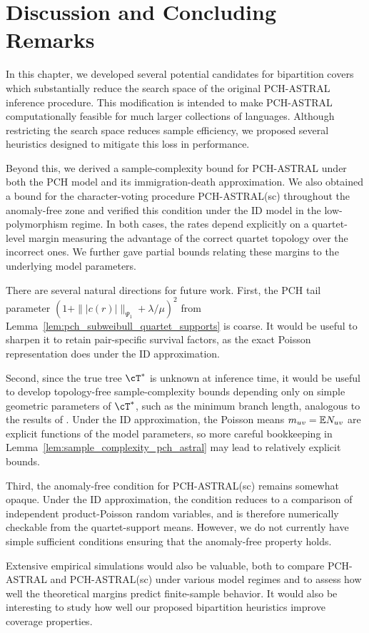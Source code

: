 \section{Discussion and Concluding Remarks}

In this chapter, we developed several potential candidates for bipartition covers which
substantially reduce the search space of the original PCH-ASTRAL inference procedure.
This modification is intended to make PCH-ASTRAL computationally feasible for much larger
collections of languages. Although restricting the search space reduces sample efficiency,
we proposed several heuristics designed to mitigate this loss in performance.

Beyond this, we derived a sample-complexity bound for PCH-ASTRAL under both the PCH model
and its immigration-death approximation. We also obtained a bound for the character-voting
procedure PCH-ASTRAL(sc) throughout the anomaly-free zone and verified this condition under
the ID model in the low-polymorphism regime. In both cases, the rates depend explicitly on a
quartet-level margin measuring the advantage of the correct quartet topology over the
incorrect ones. We further gave partial bounds relating these margins to the underlying
model parameters.

There are several natural directions for future work. First, the PCH tail parameter
$(1+\||c(r)|\|_{\Psi_1}+\lambda/\mu)^2$ from
Lemma~\ref{lem:pch_subweibull_quartet_supports} is coarse. It would be useful to sharpen it to retain
pair-specific survival factors, as the exact Poisson representation does under the ID approximation.

Second, since the true tree $\cT^*$ is unknown at inference time, it would be useful
to develop topology-free sample-complexity bounds depending only on simple geometric
 parameters of $\cT^*$, such as the minimum branch length, analogous to the results of
 \cite{shekhar2018_how_many_genes_are_enough}. Under the ID approximation, the Poisson
 means $m_{uv}=\mathbb{E} N_{uv}$ are explicit functions of the model parameters, so more careful
bookkeeping in Lemma~\ref{lem:sample_complexity_pch_astral} may lead to relatively explicit
bounds.

Third, the anomaly-free condition for PCH-ASTRAL(sc) remains somewhat opaque. Under the ID
approximation, the condition reduces to a comparison of independent product-Poisson random
variables, and is therefore numerically checkable from the quartet-support means. However,
we do not currently have simple sufficient conditions ensuring that the anomaly-free
 property holds.

Extensive empirical simulations would also be valuable, both to compare PCH-ASTRAL and PCH-ASTRAL(sc) under various
model regimes and to assess how well the theoretical margins predict finite-sample behavior.
It would also be interesting to study how well our proposed bipartition heuristics improve
coverage properties.
